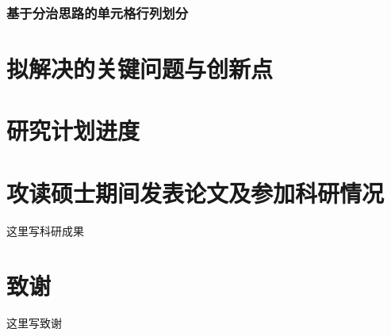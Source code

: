 \documentclass[UTF8,12pt, AutoFakeBold,fontset = founder]{ctexart}
\begin{document}
\subsubsection{基于分治思路的单元格行列划分}

\section{拟解决的关键问题与创新点}

\section{研究计划进度}

\clearpage
{} %


\clearpage
{} %
\section*{攻读硕士期间发表论文及参加科研情况}
这里写科研成果

\clearpage
{} %
\section*{致谢}
这里写致谢
\end{document}
